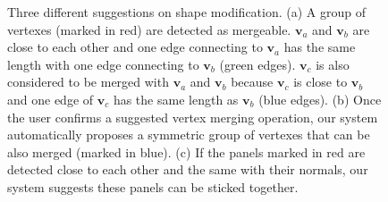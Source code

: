 \begin{figure}
	\centering
	 \hfill
	 \hfill
	 
	 \caption{Three different suggestions on shape modification. (a) A group of vertexes (marked in red) are detected as mergeable. $\mathbf{v}_a$ and $\mathbf{v}_b$ are close to each other and one edge connecting to $\mathbf{v}_a$ has the same length with one edge connecting to $\mathbf{v}_b$ (green edges). $\mathbf{v}_c$ is also considered to be merged with $\mathbf{v}_a$ and $\mathbf{v}_b$ because $\mathbf{v}_c$ is close to $\mathbf{v}_b$ and one edge of $\mathbf{v}_c$ has the same length as $\mathbf{v}_b$ (blue edges). (b) Once the user confirms a suggested vertex merging operation, our system automatically proposes a symmetric group of vertexes that can be also merged (marked in blue). (c) If the panels marked in red are detected close to each other and the same with their normals, our system suggests these panels can be sticked together.}
	 \label{fig:suggestion}
\end{figure}

